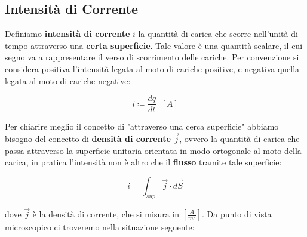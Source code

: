 \subsection{Intensità di Corrente}
Definiamo \textbf{intensità di corrente} $i$ la quantità di carica che scorre nell'unità di tempo attraverso una \textbf{certa superficie}. Tale valore è una quantità scalare, il cui segno va a rappresentare il verso di scorrimento delle cariche. Per convenzione si considera positiva l'intensità legata al moto di cariche positive, e negativa quella legata al moto di cariche negative:

\begin{large}
	\begin{equation} \label{eq_intensita_corrente}
		i\coloneqq \frac{dq}{dt} \;\; \left[A\right]
	\end{equation}
\end{large}

Per chiarire meglio il concetto di "attraverso una cerca superficie" abbiamo bisogno del concetto di \textbf{densità di corrente} $\vec{j} $, ovvero la quantità di carica che passa attraverso la superficie unitaria orientata in modo ortogonale al moto della carica, in pratica l'intensità non è altro che il \textbf{flusso} tramite tale superficie: 

\begin{large}
	\begin{equation}
		i = \int_{sup} \vec{j} \cdot d\vec{S}
	\end{equation}
\end{large}

dove $\vec{j}$ è la densità di corrente, che si misura in $\left[\frac{A}{m^2}\right]$. Da punto di vista microscopico ci troveremo nella situazione seguente: 

\begin{figure}[ht]
	\centering
\end{figure}

